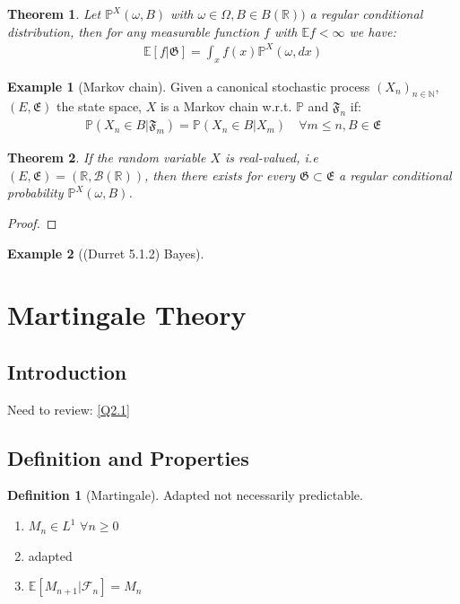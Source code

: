 \documentclass[a4paper,11pt]{book}
\newtheorem{theorem}{Theorem}[section]
\theoremstyle{definition}
\newtheorem{definition}{Definition}[section]
\newtheorem*{example}{Example}
\theoremstyle{remark}
\begin{document}
\begin{theorem}
	Let $\mathbb{P}^X(\omega, B)$ with $\omega \in \Omega, B \in B(\mathbb{R}))$ a regular conditional distribution, then for any measurable function $f$ with $\mathbb{E}f < \infty$ we have:
	\begin{align*}
		\mathbb{E}[f|\mathfrak{G}] = \int_x f(x) \mathbb{P}^X(\omega, dx)
	\end{align*}
\end{theorem}

 \begin{example}[Markov chain]
 Given a canonical stochastic process $(X_n)_{n \in \mathbb{N}}$, $(E, \mathfrak{E})$ the state space, $X$ is a Markov chain w.r.t. $\mathbb{P}$ and $\mathfrak{F}_n$ if:
 \begin{align*}
 	\mathbb{P}(X_n\in B | \mathfrak{F}_m) = \mathbb{P}(X_n \in B|X_{m}) \quad \forall m \le n, B \in \mathfrak{E}
 \end{align*}
 \end{example}

\begin{theorem}
	If the random variable $X$ is real-valued, i.e $(E, \mathfrak{E}) = ( \mathbb{R}, \mathcal{B}(\mathbb{R}))$, then there exists for every 
	$\mathfrak{G} \subset \mathfrak{E}$ a regular conditional probability $\mathbb{P}^X(\omega, B)$.
\end{theorem}
\begin{proof}
\end{proof}

\begin{example}[(Durret 5.1.2) Bayes]

\end{example}


\newpage
\section{Martingale Theory}
\subsection{Introduction}
Need to review: \ref{Q2.1} 	
\subsection{Definition and Properties}
\begin{definition}[Martingale]
Adapted not necessarily predictable.
\begin{enumerate}
	\item $M_n \in L^1$ $\forall n \geq 0$
	\item adapted
	\item $\mathbb{E}[M_{n+1}|\mathcal{F}_{n}] = M_n$
\end{enumerate}
\end{definition}
\end{document}

